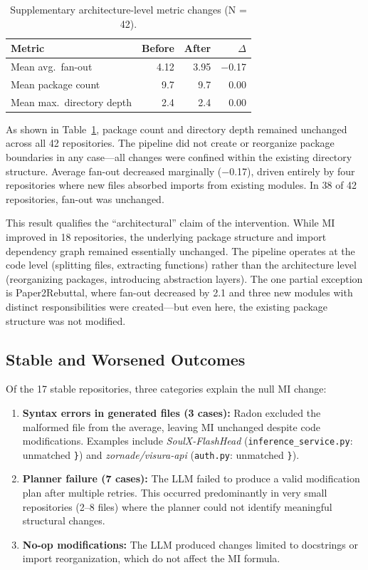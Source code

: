 \documentclass[sigconf,review,anonymous]{acmart}
\begin{document}
\begin{table}[H]
\centering
\small
\caption{Supplementary architecture-level metric changes (N = 42).}
\label{tab:exp5_supp}
\begin{tabular}{lrrr}
\toprule
\textbf{Metric} & \textbf{Before} & \textbf{After} & \textbf{$\Delta$} \\
\midrule
Mean avg.\ fan-out        & 4.12 & 3.95 & $-$0.17 \\
Mean package count        & 9.7  & 9.7  & 0.00 \\
Mean max.\ directory depth & 2.4  & 2.4  & 0.00 \\
\bottomrule
\end{tabular}
\end{table}

As shown in Table~\ref{tab:exp5_supp}, package count and directory depth remained unchanged across all 42 repositories. The pipeline did not create or reorganize package boundaries in any case---all changes were confined within the existing directory structure. Average fan-out decreased marginally ($-$0.17), driven entirely by four repositories where new files absorbed imports from existing modules. In 38 of 42 repositories, fan-out was unchanged.

This result qualifies the ``architectural'' claim of the intervention. While MI improved in 18 repositories, the underlying package structure and import dependency graph remained essentially unchanged. The pipeline operates at the code level (splitting files, extracting functions) rather than the architecture level (reorganizing packages, introducing abstraction layers). The one partial exception is Paper2Rebuttal, where fan-out decreased by 2.1 and three new modules with distinct responsibilities were created---but even here, the existing package structure was not modified.

\subsection{Stable and Worsened Outcomes}

Of the 17 stable repositories, three categories explain the null MI change:

\begin{enumerate}[nosep]
    \item \textbf{Syntax errors in generated files (3 cases):} Radon excluded the malformed file from the average, leaving MI unchanged despite code modifications. Examples include \textit{SoulX-FlashHead} (\texttt{inference\_service.py}: unmatched \texttt{\}}) and \textit{zornade/visura-api} (\texttt{auth.py}: unmatched \texttt{\}}).
    \item \textbf{Planner failure (7 cases):} The LLM failed to produce a valid modification plan after multiple retries. This occurred predominantly in very small repositories (2--8 files) where the planner could not identify meaningful structural changes.
    \item \textbf{No-op modifications:} The LLM produced changes limited to docstrings or import reorganization, which do not affect the MI formula.
\end{enumerate}
\end{document}
